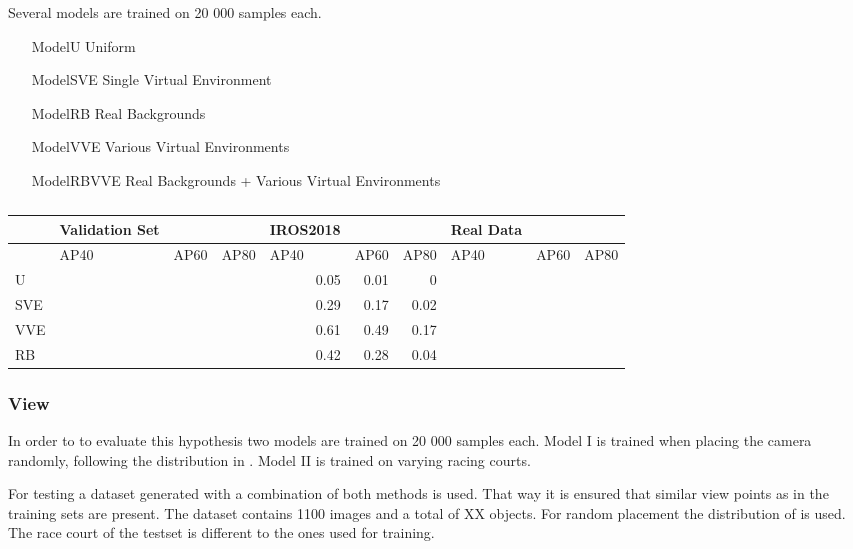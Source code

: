 Several models are trained on 20 000 samples each.
\begin{itemize}
	\item[ModelU] Uniform
	\item[ModelSVE] Single Virtual Environment
	\item[ModelRB] Real Backgrounds
	\item[ModelVVE] Various Virtual Environments
	\item[ModelRBVVE] Real Backgrounds + Various Virtual Environments
\end{itemize}


\begin{table}[htbp]
	\caption{}
	\begin{tabular}{|l|l|l|l|r|r|r|l|l|l|}
		\hline
		& Validation Set &  &  & \multicolumn{1}{l|}{IROS2018} & \multicolumn{1}{l|}{} & \multicolumn{1}{l|}{} & Real Data &  &  \\ \hline
		& AP40 & AP60 & AP80 & \multicolumn{1}{l|}{AP40} & \multicolumn{1}{l|}{AP60} & \multicolumn{1}{l|}{AP80} & AP40 & AP60 & AP80 \\ \hline
		U &  &  &  & 0.05 & 0.01 & 0 &  &  &  \\ \hline
		SVE &  &  &  & 0.29 & 0.17 & 0.02 &  &  &  \\ \hline
		VVE &  &  &  & 0.61 & 0.49 & 0.17 &  &  &  \\ \hline
		RB &  &  &  & 0.42 & 0.28 & 0.04 &  &  &  \\ \hline
	\end{tabular}
	\label{tab:env}
\end{table}


\subsubsection{View}

In order to to evaluate this hypothesis two models are trained on 20 000 samples each. Model I is trained when placing the camera randomly, following the distribution in . Model II is trained on varying racing courts. 

For testing a dataset generated with a combination of both methods is used. That way it is ensured that similar view points as in the training sets are present. The dataset contains 1100 images and a total of XX objects. For random placement the distribution of  is used. The race court of the testset is different to the ones used for training. 


